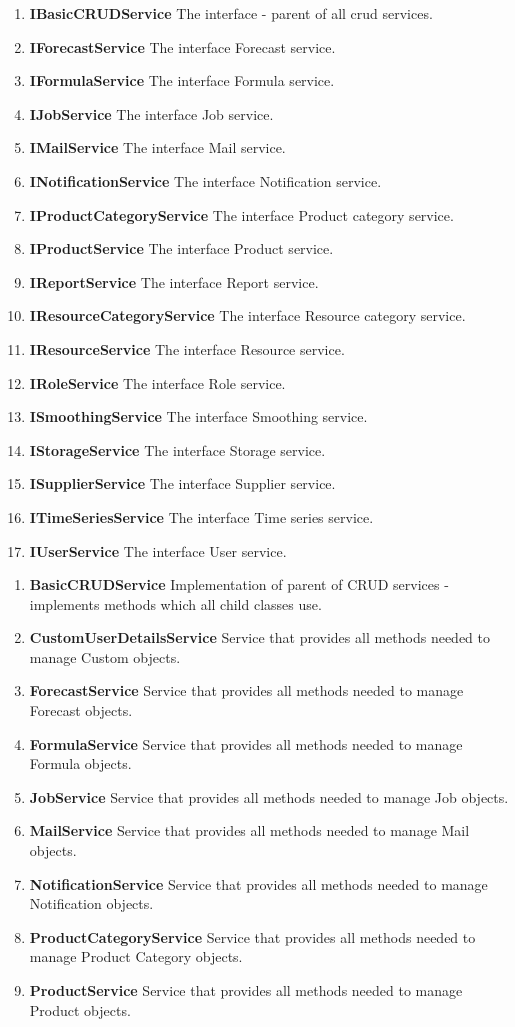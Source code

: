 \documentclass[a4paper,11pt,twoside]{report}
\theoremstyle{definition}
\begin{document}
\begin{enumerate}
\begin{enumerate}
\item \textbf{IBasicCRUDService} The interface - parent of all crud services.
\item \textbf{IForecastService} The interface Forecast service.
\item \textbf{IFormulaService} The interface Formula service.
\item \textbf{IJobService} The interface Job service.
\item \textbf{IMailService} The interface Mail service.
\item \textbf{INotificationService} The interface Notification service.
\item \textbf{IProductCategoryService} The interface Product category service.
\item \textbf{IProductService} The interface Product service.
\item \textbf{IReportService} The interface Report service.
\item \textbf{IResourceCategoryService} The interface Resource category service.
\item \textbf{IResourceService} The interface Resource service.
\item \textbf{IRoleService} The interface Role service.
\item \textbf{ISmoothingService} The interface Smoothing service.
\item \textbf{IStorageService} The interface Storage service.
\item \textbf{ISupplierService} The interface Supplier service.
\item \textbf{ITimeSeriesService} The interface Time series service.
\item \textbf{IUserService} The interface User service.

\end{enumerate} 
\begin{enumerate} 
\item \textbf{BasicCRUDService} Implementation of parent of CRUD services - implements methods which all child classes use.
\item \textbf{CustomUserDetailsService} Service that provides all methods needed to manage Custom objects.
\item \textbf{ForecastService} Service that provides all methods needed to manage Forecast objects.
\item \textbf{FormulaService} Service that provides all methods needed to manage Formula objects.
\item \textbf{JobService} Service that provides all methods needed to manage Job objects.
\item \textbf{MailService} Service that provides all methods needed to manage Mail objects.
\item \textbf{NotificationService} Service that provides all methods needed to manage Notification objects.
\item \textbf{ProductCategoryService} Service that provides all methods needed to manage Product Category objects.
\item \textbf{ProductService} Service that provides all methods needed to manage Product objects.



\end{enumerate}
\end{enumerate}
\end{document}

